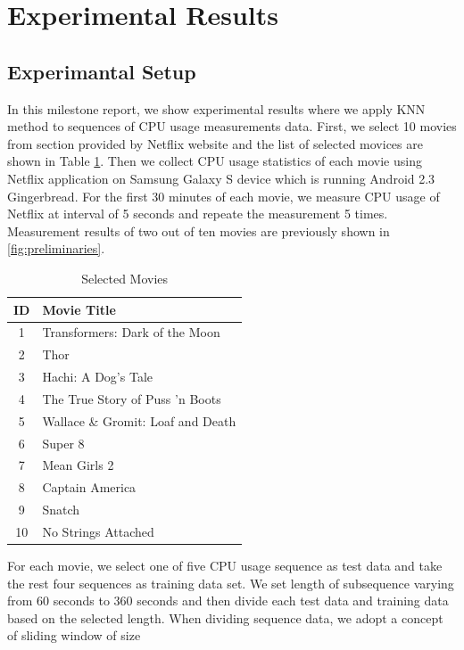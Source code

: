 \section{Experimental Results}
\label{sec:experiments}

\subsection{Experimantal Setup}
In this milestone report, we show experimental results where we apply KNN method to sequences of CPU usage measurements data.
First, we select 10 movies from  section provided by Netflix website and the list of selected movices are shown in Table \ref{tab:movies}.
Then we collect CPU usage statistics of each movie using Netflix application on Samsung Galaxy S device which is running Android 2.3 Gingerbread.
For the first 30 minutes of each movie, we measure CPU usage of Netflix at interval of 5 seconds and repeate the measurement 5 times.
Measurement results of two out of ten movies are previously shown in \ref{fig:preliminaries}.

\begin{table}[h!]
\begin{center}
\begin{tabular}{|c|l|}
\hline
ID & Movie Title \\
\hline
1 & Transformers: Dark of the Moon \\
2 & Thor \\
3 & Hachi: A Dog's Tale \\
4 & The True Story of Puss 'n Boots \\
5 & Wallace \& Gromit: Loaf and Death \\
6 & Super 8 \\
7 & Mean Girls 2 \\
8 & Captain America \\
9 & Snatch \\
10 & No Strings Attached \\
\hline
\end{tabular}
\end{center}
\caption{Selected Movies}
\label{tab:movies}
\end{table}

For each movie, we select one of five CPU usage sequence as test data and take the rest four sequences as training data set. 
We set length of subsequence varying from 60 seconds to 360 seconds and then divide each test data and training data based on the selected length. 
When dividing sequence data, we adopt a concept of sliding window of size 


